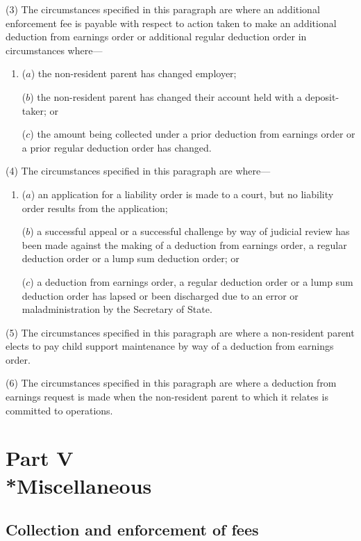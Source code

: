 \documentclass[12pt,a4paper]{article}
\begin{document}
(3) The circumstances specified in this paragraph are where an additional enforcement fee is payable with respect to action taken to make an additional deduction from earnings order or additional regular deduction order in circumstances where—
\begin{enumerate}\item[]
($a$) the non-resident parent has changed employer;

($b$) the non-resident parent has changed their account held with a deposit-taker; or

($c$) the amount being collected under a prior deduction from earnings order or a prior regular deduction order has changed.
\end{enumerate}

(4) The circumstances specified in this paragraph are where—
\begin{enumerate}\item[]
($a$) an application for a liability order is made to a court, but no liability order results from the application;

($b$) a successful appeal or a successful challenge by way of judicial review has been made against the making of a deduction from earnings order, a regular deduction order or a lump sum deduction order; or

($c$) a deduction from earnings order, a regular deduction order or a lump sum deduction order has lapsed or been discharged due to an error or maladministration by the Secretary of State.
\end{enumerate}

(5) The circumstances specified in this paragraph are where a non-resident parent elects to pay child support maintenance by way of a deduction from earnings order.

(6) The circumstances specified in this paragraph are where a deduction from earnings request is made when the non-resident parent to which it relates is committed to operations.

\section[Part V --- Miscellaneous]{Part V\\*Miscellaneous}

\renewcommand\parthead{--- Part V}

\subsection[13. Collection and enforcement of fees]{Collection and enforcement of fees}
\end{document}

